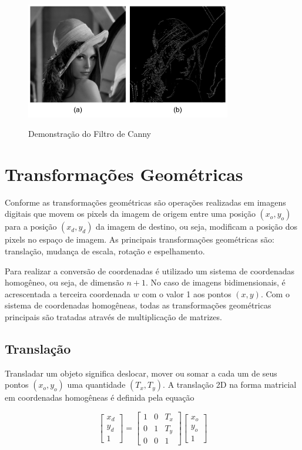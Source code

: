 \documentclass[12pt,oneside,a4paper,english,french,spanish,brazil,]{abntex2}
\begin{document}
\begin{figure}[ht]
\centering
\caption{Demonstração do Filtro de Canny}
\includegraphics[width=0.8\textwidth]{imagens/PDI_Canny.pdf}
\sourceAuthor
\label{fig:PDI_Canny}
\end{figure}

\section{Transformações Geométricas}

Conforme \citet{conci:2003} as transformações geométricas são operações realizadas em imagens digitais que movem os pixels da imagem de origem entre uma posição \((x_o,y_o)\) para a posição \((x_d,y_d)\) da imagem de destino, ou seja, modificam a posição dos pixels no espaço de imagem. As principais transformações geométricas são: translação, mudança de escala, rotação e espelhamento.

Para realizar a conversão de coordenadas é utilizado um sistema de coordenadas homogêneo, ou seja, de dimensão \(n+1\). No caso de imagens bidimensionais, é acrescentada a terceira coordenada \(w\) com o valor 1 aos pontos \((x, y)\). Com o sistema de coordenadas homogêneas, todas as transformações geométricas principais são tratadas através de multiplicação de matrizes.

\subsection{Translação}

Transladar um objeto significa deslocar, mover ou somar a cada um de seus pontos \((x_o,y_o)\) uma quantidade \((T_x,T_y)\). A translação 2D na forma matricial em coordenadas homogêneas é definida pela equação

\[
\begin{bmatrix}
x_d\\ 
y_d\\ 
1
\end{bmatrix}
=
\begin{bmatrix}
1 & 0 & T_x\\ 
0 & 1 & T_y\\ 
0 & 0 & 1
\end{bmatrix}
\begin{bmatrix}
x_o\\ 
y_o\\ 
1
\end{bmatrix}
\]
\end{document}
